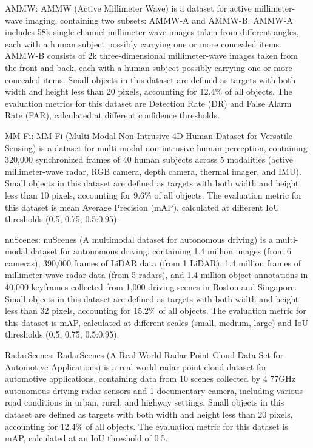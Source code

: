 \documentclass[journal]{IEEEtran}
\begin{document}
AMMW\cite{yu2021active}: AMMW (Active Millimeter Wave) is a dataset for active millimeter-wave imaging, containing two subsets: AMMW-A and AMMW-B. AMMW-A includes 58k single-channel millimeter-wave images taken from different angles, each with a human subject possibly carrying one or more concealed items. AMMW-B consists of 2k three-dimensional millimeter-wave images taken from the front and back, each with a human subject possibly carrying one or more concealed items. Small objects in this dataset are defined as targets with both width and height less than 20 pixels, accounting for 12.4\% of all objects. The evaluation metrics for this dataset are Detection Rate (DR) and False Alarm Rate (FAR), calculated at different confidence thresholds.

MM-Fi\cite{yang2024mm}: MM-Fi (Multi-Modal Non-Intrusive 4D Human Dataset for Versatile Sensing) is a dataset for multi-modal non-intrusive human perception, containing 320,000 synchronized frames of 40 human subjects across 5 modalities (active millimeter-wave radar, RGB camera, depth camera, thermal imager, and IMU). Small objects in this dataset are defined as targets with both width and height less than 10 pixels, accounting for 9.6\% of all objects. The evaluation metric for this dataset is mean Average Precision (mAP), calculated at different IoU thresholds (0.5, 0.75, 0.5:0.95).

nuScenes\cite{caesar2020nuscenes}: nuScenes (A multimodal dataset for autonomous driving) is a multi-modal dataset for autonomous driving, containing 1.4 million images (from 6 cameras), 390,000 frames of LiDAR data (from 1 LiDAR), 1.4 million frames of millimeter-wave radar data (from 5 radars), and 1.4 million object annotations in 40,000 keyframes collected from 1,000 driving scenes in Boston and Singapore. Small objects in this dataset are defined as targets with both width and height less than 32 pixels, accounting for 15.2\% of all objects. The evaluation metric for this dataset is mAP, calculated at different scales (small, medium, large) and IoU thresholds (0.5, 0.75, 0.5:0.95).

RadarScenes\cite{schumann2021radarscenes}: RadarScenes (A Real-World Radar Point Cloud Data Set for Automotive Applications) is a real-world radar point cloud dataset for automotive applications, containing data from 10 scenes collected by 4 77GHz autonomous driving radar sensors and 1 documentary camera, including various road conditions in urban, rural, and highway settings. Small objects in this dataset are defined as targets with both width and height less than 20 pixels, accounting for 12.4\% of all objects. The evaluation metric for this dataset is mAP, calculated at an IoU threshold of 0.5.
\end{document}
